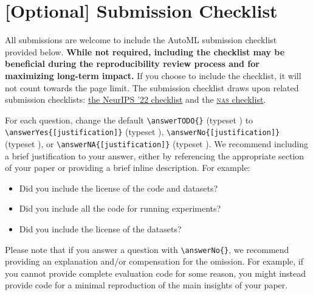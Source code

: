 \documentclass[11pt]{article}
\begin{document}


\newpage
\section{[Optional] Submission Checklist}
All submissions are welcome to include the AutoML submission checklist provided
below. \textbf{While not required, including the checklist may be beneficial
  during the reproducibility review process and for maximizing long-term
  impact.} If you choose to include the checklist, it will not count towards the
page limit. The submission checklist draws upon related submission checklists:
%
\href{https://neurips.cc/Conferences/2022/PaperInformation/PaperChecklist}
     {the NeurIPS '22 checklist}
%
and the
\href{https://www.automl.org/wp-content/uploads/NAS/NAS_checklist.pdf}
     {\textsc{nas} checklist}.
%

For each question, change the default \verb|\answerTODO{}| (typeset \answerTODO)
to
\verb|\answerYes{[justification]}| (typeset \answerYes),
\verb|\answerNo{[justification]}| (typeset \answerNo), or
\verb|\answerNA{[justification]}| (typeset \answerNA).
We recommend including a brief justification to your answer, either by
referencing the appropriate section of your paper or providing a brief inline
description.  For example:
\begin{itemize}
\item Did you include the license of the code and datasets? 
\item Did you include all the code for running experiments? 
\item Did you include the license of the datasets? 
\end{itemize}
Please note that if you answer a question with \verb|\answerNo{}|, we recommend
providing an explanation and/or compensation for the omission. For example, if
you cannot provide complete evaluation code for some reason, you might instead
provide code for a minimal reproduction of the main insights of your paper.
\end{document}
